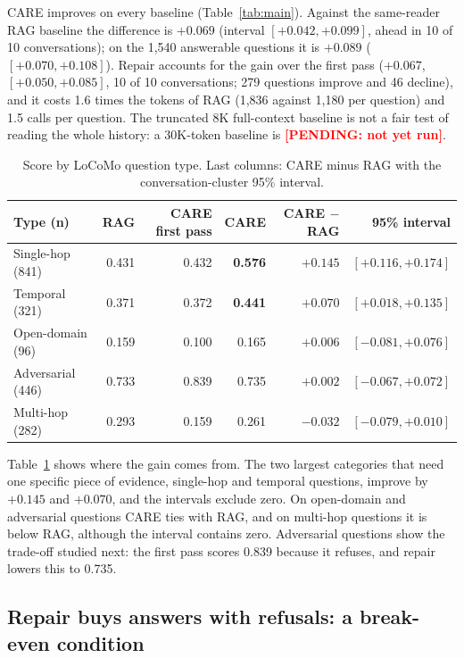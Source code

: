 \documentclass[10pt]{article}
\theoremstyle{plain}
\newcommand{\care}{\textsc{CARE}}
\newcommand{\pending}[1]{\textcolor{red}{\textbf{[PENDING: #1]}}}
\begin{document}
\care{} improves on every baseline (Table~\ref{tab:main}). Against the same-reader RAG baseline the difference is
$+0.069$ (interval $[+0.042,+0.099]$, ahead in 10 of 10 conversations); on the 1,540 answerable questions it is
$+0.089$ ($[+0.070,+0.108]$). Repair accounts for the gain over the first pass ($+0.067$, $[+0.050,+0.085]$, 10 of 10
conversations; 279 questions improve and 46 decline), and it costs 1.6 times the tokens of RAG (1,836 against 1,180
per question) and 1.5 calls per question. The truncated 8K full-context baseline is not a fair test of reading the
whole history: a 30K-token baseline is \pending{not yet run}.

\begin{table}[t]
\centering
\caption{Score by LoCoMo question type. Last columns: \care{} minus RAG with the conversation-cluster 95\% interval.}
\label{tab:category}
\small
\begin{tabular}{lrrrrr}
\toprule
Type (n) & RAG & \care{} first pass & \care{} & \care{} $-$ RAG & 95\% interval \\
\midrule
Single-hop (841) & 0.431 & 0.432 & \textbf{0.576} & $+0.145$ & $[+0.116,+0.174]$ \\
Temporal (321) & 0.371 & 0.372 & \textbf{0.441} & $+0.070$ & $[+0.018,+0.135]$ \\
Open-domain (96) & 0.159 & 0.100 & 0.165 & $+0.006$ & $[-0.081,+0.076]$ \\
Adversarial (446) & 0.733 & 0.839 & 0.735 & $+0.002$ & $[-0.067,+0.072]$ \\
Multi-hop (282) & 0.293 & 0.159 & 0.261 & $-0.032$ & $[-0.079,+0.010]$ \\
\bottomrule
\end{tabular}
\end{table}

Table~\ref{tab:category} shows where the gain comes from. The two largest categories that need one specific piece of
evidence, single-hop and temporal questions, improve by $+0.145$ and $+0.070$, and the intervals exclude zero. On
open-domain and adversarial questions \care{} ties with RAG, and on multi-hop questions it is below RAG, although the
interval contains zero. Adversarial questions show the trade-off studied next: the first pass scores 0.839 because it
refuses, and repair lowers this to 0.735.

\subsection{Repair buys answers with refusals: a break-even condition}
\label{sec:abstention}
\end{document}

